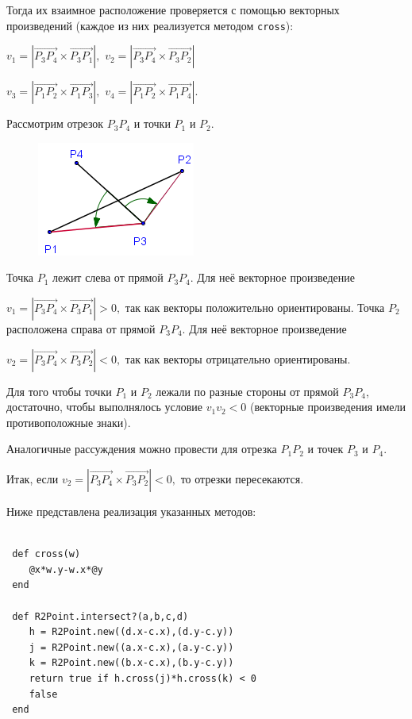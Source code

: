 \newpage
Тогда их взаимное расположение проверяется с помощью векторных произведений
 (каждое из них реализуется методом \verb|cross|):
\begin{center}
$v_1 = |\vec {P_3P_4} \times \vec {P_3P_1}|, $
$v_2 = |\vec {P_3P_4} \times \vec {P_3P_2}|$

$v_3 = |\vec {P_1P_2} \times \vec {P_1P_3}|, $
$v_4 = |\vec {P_1P_2} \times \vec {P_1P_4}|$.
\end{center}
Рассмотрим отрезок $P_3P_4$ и точки $P_1$ и $P_2$.

\begin{figure}[ht!]
\begin{center}
\includegraphics[width=0.5\hsize]{images/conv_5}
\end{center}
\caption{}\label{fig:conv_5}
\end{figure}

Точка $P_1$ лежит слева от прямой $P_3P_4$. Для неё
векторное произведение

 $v_1 = |\vec {P_3P_4} \times \vec {P_3P_1}| > 0,$
так как векторы положительно ориентированы.
Точка $P_2$ расположена справа от прямой $P_3P_4$. Для неё
 векторное произведение

 $v_2 = |\vec {P_3P_4} \times \vec {P_3P_2}| < 0,$
 так как векторы отрицательно ориентированы.

Для того чтобы точки $P_1$ и $P_2$ лежали по разные стороны от прямой $P_3P_4$,
 достаточно, чтобы выполнялось условие $v_1v_2 < 0$ (векторные произведения имели противоположные  знаки).

Аналогичные рассуждения можно провести для отрезка $P_1P_2$ и точек $P_3$ и $P_4$.

Итак, если $v_2 = |\vec {P_3P_4} \times \vec {P_3P_2}| < 0,$ то отрезки пересекаются.

Ниже представлена реализация указанных методов:

\begin{lstlisting}

 def cross(w)
    @x*w.y-w.x*@y
 end

 def R2Point.intersect?(a,b,c,d)
    h = R2Point.new((d.x-c.x),(d.y-c.y))
    j = R2Point.new((a.x-c.x),(a.y-c.y))
    k = R2Point.new((b.x-c.x),(b.y-c.y))
    return true if h.cross(j)*h.cross(k) < 0
    false
 end
\end{lstlisting}


